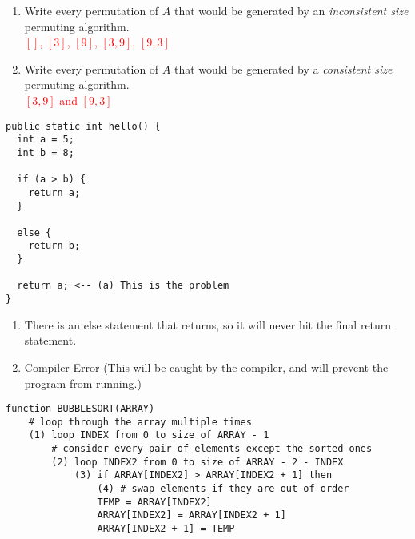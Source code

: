 \documentclass[11pt,addpoints]{exam}
\begin{document}
\begin{questions}


\begin{enumerate}[label=(\Alph*)]
  \item Write every permutation of $A$ that would be generated by an \textit{inconsistent size} permuting algorithm. \\

  \textcolor{red}{$[]$, $[3]$, $[9]$, $[3, 9]$, $[9, 3]$}


  \item Write every permutation of $A$ that would be generated by a \textit{consistent size} permuting algorithm. \\
   
  \textcolor{red}{$[3,9]$ and $[9,3]$}

\end{enumerate}

\begin{minipage}{\textwidth}

\begin{verbatim}
public static int hello() {
  int a = 5;
  int b = 8;

  if (a > b) {
    return a;
  }

  else {
    return b;
  }

  return a; <-- (a) This is the problem
}
\end{verbatim}

\begin{enumerate}[label=(\alph*)]
  \addtocounter{enumi}{1}
  \item There is an else statement that returns, so it will never hit the final return statement.
  \item Compiler Error (This will be caught by the compiler, and will prevent the program from running.)
\end{enumerate}

\end{minipage}


\begin{verbatim}
function BUBBLESORT(ARRAY)							            
    # loop through the array multiple times
    (1) loop INDEX from 0 to size of ARRAY - 1					    
        # consider every pair of elements except the sorted ones
        (2) loop INDEX2 from 0 to size of ARRAY - 2 - INDEX			
            (3) if ARRAY[INDEX2] > ARRAY[INDEX2 + 1] then			
                (4) # swap elements if they are out of order
                TEMP = ARRAY[INDEX2]						    
                ARRAY[INDEX2] = ARRAY[INDEX2 + 1]				
                ARRAY[INDEX2 + 1] = TEMP					    
\end{verbatim}


\end{questions}
\end{document}
